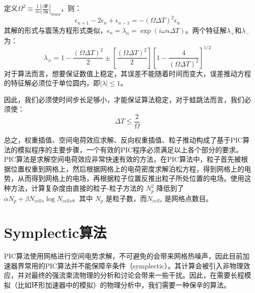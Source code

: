 {定义$\Omega^2 \equiv \frac{1}{m} \left| \frac{\partial\mathbf{F}}{\partial\mathbf{x}}\right|_{max} $，则：
      \begin{equation}
         {\epsilon}_{n+1}-2{\epsilon}_n+{\epsilon}_{n-1} = -(\Omega \Delta T)^2 {\epsilon}_n
         \label{eq:leapfrog_stabilit12}
      \end{equation}
其解的形式与震荡方程形式类似，${\epsilon}_n = {\lambda}_n = \exp(i\omega n \Delta T)$。两个特征解${\lambda}_+$和${\lambda}_-$为：
      \begin{equation}
         \label{eq:leapfrog_stabilit13}
         {\lambda}_\pm = 1- \frac{(\Omega \Delta T)^2}{2}\pm \left[\frac{(\Omega \Delta T)^2}{2}\right]\left[1-\frac{4}{(\Omega \Delta T)^2}\right]^{1/2}
      \end{equation}
对于算法而言，想要保证数值上稳定，其误差不能随着时间而变大，误差推动方程的特征解必须位于单位圆内，即$|\lambda| \leq 1$。

因此，我们必须使时间步长足够小，才能保证算法稳定，对于蛙跳法而言，我们必须使：
      \begin{equation}
          \Delta T \leq \frac{2}{\Omega}
      \end{equation}

总之，权重插值、空间电荷效应求解、反向权重插值、粒子推动构成了基于PIC算法的模拟程序的主要步骤，一个有效的PIC程序必须满足以上各个部分的要求。PIC算法是求解空间电荷效应非常快速有效的方法，在PIC算法中，粒子首先被根据位置权重到网格上，然后根据网格上的电荷密度求解泊松方程，得到网格上的电势，从而得到网格上的电场，再根据粒子位置反推出粒子所处位置的电场。使用这种方法，计算复杂度由直接的粒子-粒子方法的 $N_p^2$ 降低到了$\alpha N_p + \beta N_{cells}\log{N_{cells}}$。其中 $N_p$ 是粒子数，而$N_{cells}$ 是网格点数目。

\section{Symplectic算法}          \label{section:symplectic_theory}

PIC算法使用网格进行空间电势求解，不可避免的会带来网格热噪声，因此目前加速器界常用的PIC算法并不能保障辛条件（symplectic）。其计算会被引入非物理效应，并对最终的强流束流物理的分析和讨论会带来一些干扰。因此，在需要长程模拟（比如环形加速器中的模拟）的物理分析中，我们需要一种保辛的算法。

}

